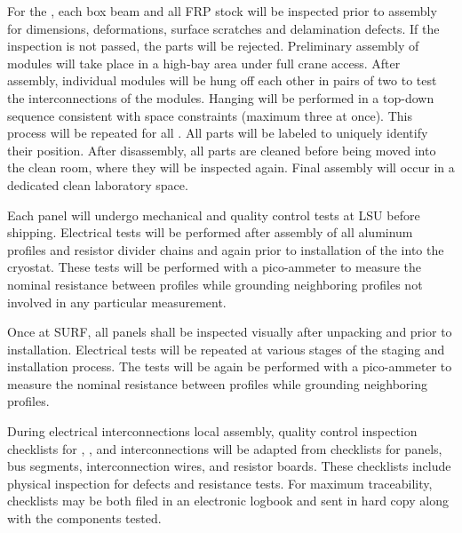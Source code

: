 For the , each box beam and all FRP stock will be inspected prior to assembly for dimensions, deformations, surface scratches and delamination defects. If the inspection is not passed, the parts will be rejected.
Preliminary assembly of  modules will take place in a high-bay area under full crane access. After assembly, individual  modules will be hung off each other in pairs of two to test the interconnections of the modules. Hanging will be performed in a top-down sequence consistent with space constraints (maximum three at once). This process will be repeated for all . All parts will be labeled to uniquely identify their position. After disassembly, all parts are cleaned before being moved into the clean room, where they will be inspected again. Final assembly will occur in a dedicated clean laboratory space.

Each panel will undergo mechanical and quality control tests at LSU before shipping. 
 Electrical  tests will be performed after assembly of all aluminum profiles and resistor divider chains and again prior to installation of the  into the cryostat. These tests will be performed with a pico-ammeter to measure the nominal resistance between profiles while grounding neighboring profiles not involved in any particular measurement.





Once at SURF, all  panels shall be inspected visually after unpacking and prior to installation. Electrical tests will be repeated at various stages of the staging and installation process.
The tests will be again be performed with a pico-ammeter to measure the nominal resistance between profiles while grounding neighboring profiles.

During electrical interconnections local assembly, quality control inspection checklists for , , and
interconnections will be adapted from  checklists for 
panels,  bus segments, interconnection wires, and resistor boards.
These checklists include physical inspection for defects and
resistance tests.  For maximum traceability, checklists may be both
filed in an electronic logbook and sent in hard copy along with the
components tested.

